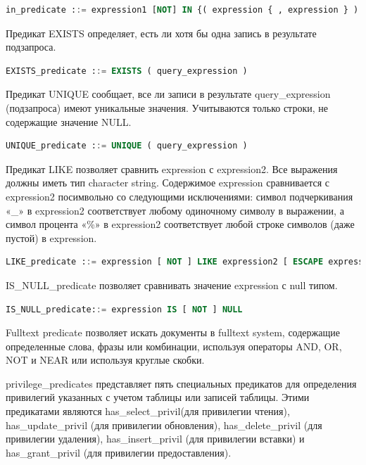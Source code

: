 \begin{lstlisting}[language=sql, label=some-code, caption=Спецификация in\_predicate]
   in_predicate ::= expression1 [NOT] IN {( expression { , expression } ) | ( query_expression )}
\end{lstlisting}

Предикат EXISTS определяет, есть ли хотя бы одна запись в результате подзапроса.

\begin{lstlisting}[language=sql, label=some-code, caption=Спецификация EXISTS\_predicate]
   EXISTS_predicate ::= EXISTS ( query_expression )
\end{lstlisting}

Предикат UNIQUE сообщает, все ли записи в результате query\_expression (подзапроса)
имеют уникальные значения. Учитываются только строки, не содержащие значение NULL.

\begin{lstlisting}[language=sql, label=some-code, caption=Спецификация UNIQUE\_predicate]
   UNIQUE_predicate ::= UNIQUE ( query_expression )
\end{lstlisting}

Предикат LIKE позволяет сравнить expression с expression2. 
Все выражения должны иметь тип character string.
Содержимое expression сравнивается с expression2 посимвольно со следующими исключениями: 
символ подчеркивания «\_» в expression2 соответствует любому одиночному символу в выражении, 
а символ процента «\%» в expression2 соответствует любой строке символов (даже пустой) в expression.

\begin{lstlisting}[language=sql, label=some-code, caption=Спецификация LIKE\_predicate]
   LIKE_predicate ::= expression [ NOT ] LIKE expression2 [ ESCAPE expression3 ]
\end{lstlisting}

IS\_NULL\_predicate позволяет сравнивать значение expression с null типом.

\begin{lstlisting}[language=sql, label=some-code, caption=Спецификация IS\_NULL\_predicate]
   IS_NULL_predicate::= expression IS [ NOT ] NULL
\end{lstlisting}

Fulltext predicate позволяет искать документы в fulltext system,
содержащие определенные слова, фразы или комбинации, 
используя операторы AND, OR, NOT и NEAR или используя круглые скобки.

privilege\_predicates представляет пять специальных предикатов для определения привилегий указанных
с учетом таблицы или записей таблицы. 
Этими предикатами являются has\_select\_privil(для привилегии чтения), 
has\_update\_privil (для привилегии обновления), 
has\_delete\_privil (для привилегии удаления), 
has\_insert\_privil (для привилегии вставки) 
и has\_grant\_privil (для привилегии предоставления).


